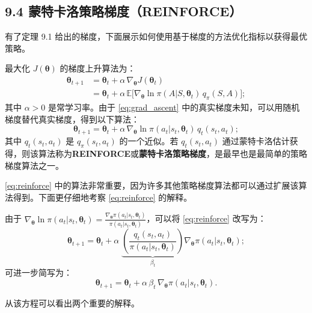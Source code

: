 \documentclass[UTF8]{article}
\begin{document}
\subsection*{9.4 蒙特卡洛策略梯度（REINFORCE）}

有了定理 9.1 给出的梯度，下面展示如何使用基于梯度的方法优化指标以获得最优策略。

最大化 $J(\boldsymbol{\theta})$ 的梯度上升算法为：
\begin{align}
\boldsymbol{\theta}_{t+1} &= \boldsymbol{\theta}_t + \alpha \, \nabla_{\boldsymbol{\theta}} J(\boldsymbol{\theta}_t) \nonumber \\
&= \boldsymbol{\theta}_t + \alpha \, \mathbb{E}\bigl[ \nabla_{\boldsymbol{\theta}} \ln \pi(A|S, \boldsymbol{\theta}_t) \, q_\pi(S, A) \bigr]; \label{eq:grad_ascent}
\end{align}
其中 $\alpha > 0$ 是常学习率。由于 \eqref{eq:grad_ascent} 中的真实梯度未知，可以用随机梯度替代真实梯度，得到以下算法：
\begin{equation}
\boldsymbol{\theta}_{t+1} = \boldsymbol{\theta}_t + \alpha \, \nabla_{\boldsymbol{\theta}} \ln \pi(a_t|s_t, \boldsymbol{\theta}_t) \, q_t(s_t, a_t); \label{eq:reinforce}
\end{equation}
其中 $q_t(s_t, a_t)$ 是 $q_\pi(s_t, a_t)$ 的一个近似。若 $q_t(s_t, a_t)$ 通过蒙特卡洛估计获得，则该算法称为\textbf{REINFORCE}或\textbf{蒙特卡洛策略梯度}，是最早也是最简单的策略梯度算法之一。

\eqref{eq:reinforce} 中的算法非常重要，因为许多其他策略梯度算法都可以通过扩展该算法得到。下面更仔细地考察 \eqref{eq:reinforce} 的解释。

由于 $\nabla_{\boldsymbol{\theta}} \ln \pi(a_t|s_t, \boldsymbol{\theta}_t) = \frac{\nabla_{\boldsymbol{\theta}} \pi(a_t|s_t, \boldsymbol{\theta}_t)}{\pi(a_t|s_t, \boldsymbol{\theta}_t)}$，可以将 \eqref{eq:reinforce} 改写为：
\[
\boldsymbol{\theta}_{t+1} = \boldsymbol{\theta}_t + \alpha \; \underbrace{\left( \frac{q_t(s_t, a_t)}{\pi(a_t|s_t, \boldsymbol{\theta}_t)} \right)}_{\beta_t} \nabla_{\boldsymbol{\theta}} \pi(a_t|s_t, \boldsymbol{\theta}_t);
\]
可进一步简写为：
\begin{equation}
\boldsymbol{\theta}_{t+1} = \boldsymbol{\theta}_t + \alpha \, \beta_t \, \nabla_{\boldsymbol{\theta}} \pi(a_t|s_t, \boldsymbol{\theta}_t). \label{eq:reinforce_compact}
\end{equation}

从该方程可以看出两个重要的解释。
\end{document}
